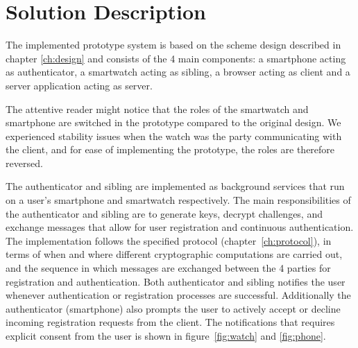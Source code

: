 \section{Solution Description}
The implemented prototype system is based on the scheme design described in chapter \ref{ch:design} and consists of the 4 main components:
a smartphone acting as \gls{authenticator}, a smartwatch acting as \gls{sibling}, a browser acting as \gls{client} and a server application acting as \gls{server}.

The attentive reader might notice that the roles of the smartwatch and smartphone are switched in the prototype compared to the original design. We experienced stability issues when the watch was the party communicating with the client, and for ease of implementing the prototype, the roles are therefore reversed.


The \gls{authenticator} and \gls{sibling} are implemented as background services that run on a user's smartphone and smartwatch respectively. The main responsibilities of the \gls{authenticator} and \gls{sibling} are to generate keys, decrypt challenges, and exchange messages that allow for user registration and continuous authentication. The implementation follows the specified protocol (chapter~\ref{ch:protocol}), in terms of when and where different cryptographic computations are carried out, and the sequence in which messages are exchanged between the 4 parties for registration and authentication.
Both \gls{authenticator} and \gls{sibling} notifies the user whenever authentication or registration processes are successful. Additionally the \gls{authenticator} (smartphone) also prompts the user to actively accept or decline incoming registration requests from the \gls{client}. The notifications that requires explicit consent from the user is shown in figure~\ref{fig:watch} and \ref{fig:phone}.



